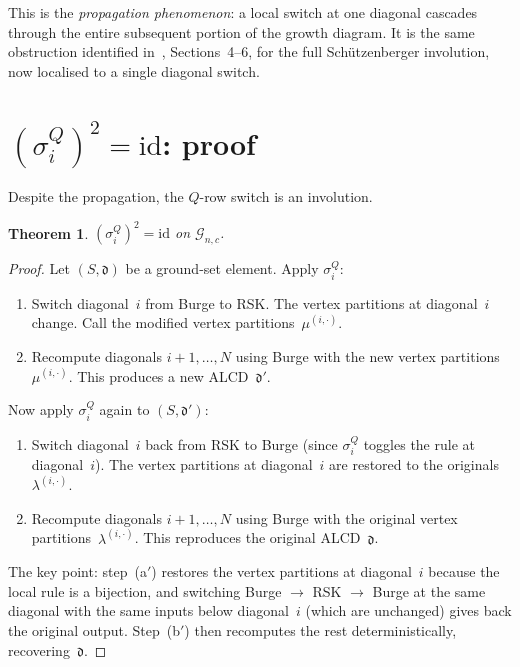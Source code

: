 \documentclass[11pt]{article}
\theoremstyle{plain}
\newtheorem{theorem}{Theorem}
\theoremstyle{definition}
\begin{document}
This is the \emph{propagation phenomenon}: a local switch at
one diagonal cascades through the entire subsequent portion
of the growth diagram.  It is the same obstruction
identified in~\cite{LOCAL_RULE}, Sections~4--6, for the full
Sch\"utzenberger involution, now localised to a single
diagonal switch.


\section{$(\sigma_i^Q)^2 = \mathrm{id}$: proof}
\label{sec:involution-proof}

Despite the propagation, the $Q$-row switch is an involution.

\begin{theorem}
\label{thm:Q-sigma-involution}
$(\sigma_i^Q)^2 = \mathrm{id}$ on $\mathcal{G}_{n,c}$.
\end{theorem}

\begin{proof}
Let $(S, \mathfrak{d})$ be a ground-set element.  Apply
$\sigma_i^Q$:
\begin{enumerate}
  \item[(a)] Switch diagonal~$i$ from Burge to RSK\@.  The
    vertex partitions at diagonal~$i$ change.  Call the
    modified vertex partitions~$\mu^{(i,\cdot)}$.
  \item[(b)] Recompute diagonals $i+1, \ldots, N$ using Burge
    with the new vertex partitions~$\mu^{(i,\cdot)}$.  This
    produces a new ALCD~$\mathfrak{d}'$.
\end{enumerate}
Now apply $\sigma_i^Q$ again to $(S, \mathfrak{d}')$:
\begin{enumerate}
  \item[(a$'$)] Switch diagonal~$i$ back from RSK to Burge
    (since $\sigma_i^Q$ toggles the rule at diagonal~$i$).
    The vertex partitions at diagonal~$i$ are restored to
    the originals~$\lambda^{(i,\cdot)}$.
  \item[(b$'$)] Recompute diagonals $i+1, \ldots, N$ using
    Burge with the original vertex
    partitions~$\lambda^{(i,\cdot)}$.  This reproduces the
    original ALCD~$\mathfrak{d}$.
\end{enumerate}
The key point: step~(a$'$) restores the vertex partitions at
diagonal~$i$ because the local rule is a bijection, and
switching Burge $\to$ RSK $\to$ Burge at the same diagonal
with the same inputs below diagonal~$i$ (which are unchanged)
gives back the original output.  Step~(b$'$) then recomputes
the rest deterministically, recovering~$\mathfrak{d}$.
\end{proof}
\end{document}
